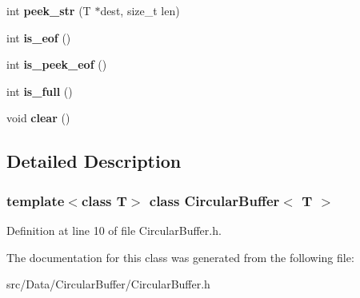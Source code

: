 \begin{DoxyCompactItemize}
\item 
\hypertarget{class_circular_buffer_a14df1b70c7a91754b740c9319c144dc2}{
int {\bfseries peek\_\-str} (T $\ast$dest, size\_\-t len)}
\label{class_circular_buffer_a14df1b70c7a91754b740c9319c144dc2}

\item 
\hypertarget{class_circular_buffer_ac6e527f12e8a2a4fe1962c2f60c06013}{
int {\bfseries is\_\-eof} ()}
\label{class_circular_buffer_ac6e527f12e8a2a4fe1962c2f60c06013}

\item 
\hypertarget{class_circular_buffer_a8e675100b2fe596e989e4b47f9c8f22d}{
int {\bfseries is\_\-peek\_\-eof} ()}
\label{class_circular_buffer_a8e675100b2fe596e989e4b47f9c8f22d}

\item 
\hypertarget{class_circular_buffer_a45d4bda288630e7e86f849cd74dd9d48}{
int {\bfseries is\_\-full} ()}
\label{class_circular_buffer_a45d4bda288630e7e86f849cd74dd9d48}

\item 
\hypertarget{class_circular_buffer_a26caa4ec94de2f342f32b6558ac697eb}{
void {\bfseries clear} ()}
\label{class_circular_buffer_a26caa4ec94de2f342f32b6558ac697eb}

\end{DoxyCompactItemize}


\subsection{Detailed Description}
\subsubsection*{template$<$class T$>$ class CircularBuffer$<$ T $>$}



Definition at line 10 of file CircularBuffer.h.



The documentation for this class was generated from the following file:\begin{DoxyCompactItemize}
\item 
src/Data/CircularBuffer/CircularBuffer.h\end{DoxyCompactItemize}

